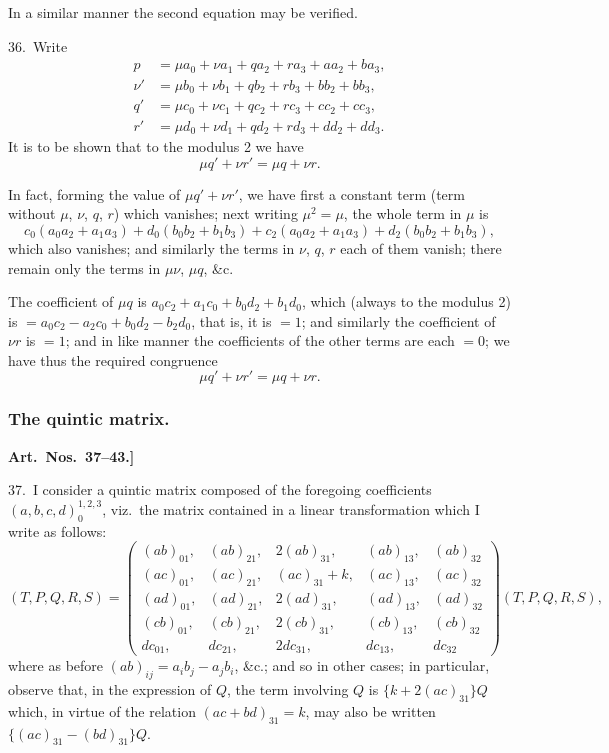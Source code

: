 \documentclass[11pt,a4paper]{article}
\theoremstyle{definition}
\begin{document}
In a similar manner the second equation may be verified.

\medskip

36.\ Write
\begin{align*}
p &= \mu a_0 + \nu a_1 + qa_2 + ra_3 + aa_2 + ba_3,\\
\nu' &= \mu b_0 + \nu b_1 + qb_2 + rb_3 + bb_2 + bb_3,\\
q' &= \mu c_0 + \nu c_1 + qc_2 + rc_3 + cc_2 + cc_3,\\
r' &= \mu d_0 + \nu d_1 + qd_2 + rd_3 + dd_2 + dd_3.
\end{align*}
It is to be shown that to the modulus 2 we have
\[
\mu q' + \nu r' = \mu q + \nu r.
\]

In fact, forming the value of $\mu q' + \nu r'$, we have first a constant term (term without $\mu$, $\nu$, $q$, $r$) which vanishes; next writing $\mu^2 = \mu$, the whole term in $\mu$ is
\[
c_0(a_0a_2 + a_1a_3) + d_0(b_0b_2 + b_1b_3) + c_2(a_0a_2 + a_1a_3) + d_2(b_0b_2 + b_1b_3),
\]
which also vanishes; and similarly the terms in $\nu$, $q$, $r$ each of them vanish; there remain only the terms in $\mu\nu$, $\mu q$, \&c.

The coefficient of $\mu q$ is $a_0c_2 + a_1c_0 + b_0d_2 + b_1d_0$, which (always to the modulus 2) is $= a_0c_2 - a_2c_0 + b_0d_2 - b_2d_0$, that is, it is $= 1$; and similarly the coefficient of $\nu r$ is $= 1$; and in like manner the coefficients of the other terms are each $= 0$; we have thus the required congruence
\[
\mu q' + \nu r' = \mu q + \nu r.
\]

\subsubsection*{The quintic matrix.}

\textbf{Art.~Nos.~37--43.]
}

37.\ I consider a quintic matrix composed of the foregoing coefficients $(a, b, c, d)_0^{1, 2, 3}$, viz.\ the matrix contained in a linear transformation which I write as follows:
\[
(T, P, Q, R, S) =
\begin{pmatrix}
(ab)_{01}, & (ab)_{21}, & 2(ab)_{31}, & (ab)_{13}, & (ab)_{32}\\
(ac)_{01}, & (ac)_{21}, & (ac)_{31} + k, & (ac)_{13}, & (ac)_{32}\\
(ad)_{01}, & (ad)_{21}, & 2(ad)_{31}, & (ad)_{13}, & (ad)_{32}\\
(cb)_{01}, & (cb)_{21}, & 2(cb)_{31}, & (cb)_{13}, & (cb)_{32}\\
dc_{01}, & dc_{21}, & 2dc_{31}, & dc_{13}, & dc_{32}
\end{pmatrix}
(T, P, Q, R, S),
\]
where as before $(ab)_{ij} = a_ib_j - a_jb_i$, \&c.; and so in other cases; in particular, observe that, in the expression of $Q$, the term involving $Q$ is $\{k + 2(ac)_{31}\}Q$ which, in virtue of the relation $(ac + bd)_{31} = k$, may also be written $\{(ac)_{31} - (bd)_{31}\}Q$.
\end{document}
